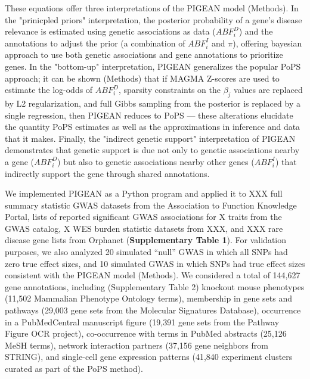 These equations offer three interpretations of the PIGEAN model (Methods). In the "prinicpled priors" interpretation, the posterior probability of a gene's disease relevance is estimated using genetic associations as data ($ABF_i^D$) and the annotations to adjust the prior (a combination of $ABF_i^I$ and $\pi$), offering bayesian approach to use both genetic associations and gene annotations to prioritize genes. In the "bottom-up" interpretation, PIGEAN generalizes the popular PoPS approach; it can be shown (Methods) that if MAGMA Z-scores are used to estimate the log-odds of $ABF_i^D$, sparsity constraints on the $\beta_j$ values are replaced by L2 regularization, and full Gibbs sampling from the posterior is replaced by a single regression, then PIGEAN reduces to PoPS --- these alterations elucidate the quantity PoPS  estimates as well as the approximations in inference and data that it makes. Finally, the "indirect genetic support" interpretation of PIGEAN demonstrates that genetic support is due not only to genetic associations nearby a gene ($ABF_i^D$) but also to genetic associations nearby other genes ($ABF_i^I$) that indirectly support the gene through shared annotations.

We implemented PIGEAN as a Python program and applied it to XXX full summary statistic GWAS datasets from the Association to Function Knowledge Portal, lists of reported significant GWAS associations for X traits from the GWAS catalog, X WES burden statistic datasets from XXX, and XXX rare disease gene lists from Orphanet (\textbf{Supplementary Table 1}). For validation purposes, we also analyzed 20 simulated “null” GWAS in which all SNPs had zero true effect sizes, and 10 simulated GWAS in which SNPs had true effect sizes consistent with the PIGEAN model (Methods). We considered a total of 144,627 gene annotations, including (Supplementary Table 2) knockout mouse phenotypes (11,502 Mammalian Phenotype Ontology terms), membership in gene sets and pathways (29,003 gene sets from the Molecular Signatures Database), occurrence in a PubMedCentral manuscript figure (19,391 gene sets from the Pathway Figure OCR project), co-occurrence with terms in PubMed abstracts (25,126 MeSH terms), network interaction partners (37,156 gene neighbors from STRING), and single-cell gene expression patterns (41,840 experiment clusters curated as part of the PoPS method).


